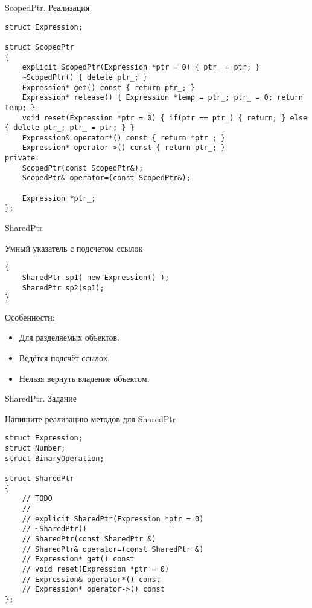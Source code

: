 \documentclass[10pt]{beamer}
\begin{document}
\begin{frame}[fragile]{ScopedPtr. Реализация}

\begin{lstlisting}
struct Expression;

struct ScopedPtr
{
    explicit ScopedPtr(Expression *ptr = 0) { ptr_ = ptr; }
    ~ScopedPtr() { delete ptr_; }
    Expression* get() const { return ptr_; }
    Expression* release() { Expression *temp = ptr_; ptr_ = 0; return temp; }
    void reset(Expression *ptr = 0) { if(ptr == ptr_) { return; } else { delete ptr_; ptr_ = ptr; } }
    Expression& operator*() const { return *ptr_; }
    Expression* operator->() const { return ptr_; }
private:
    ScopedPtr(const ScopedPtr&);
    ScopedPtr& operator=(const ScopedPtr&);

    Expression *ptr_;
};
\end{lstlisting}
\end{frame}

\begin{frame}[fragile]{SharedPtr}

Умный указатель с подсчетом ссылок 

\begin{lstlisting}
{
    SharedPtr sp1( new Expression() );
    SharedPtr sp2(sp1);
}
\end{lstlisting}

Особенности:

\begin{itemize}
    \item Для разделяемых объектов.
    \item Ведётся подсчёт ссылок.
    \item Нельзя вернуть владение объектом.
\end{itemize}

\end{frame}

\begin{frame}[fragile]{SharedPtr. Задание}

Напишите реализацию методов для SharedPtr

\begin{lstlisting}
struct Expression;
struct Number;
struct BinaryOperation;

struct SharedPtr
{
    // TODO
    //
    // explicit SharedPtr(Expression *ptr = 0)
    // ~SharedPtr()
    // SharedPtr(const SharedPtr &)
    // SharedPtr& operator=(const SharedPtr &)
    // Expression* get() const
    // void reset(Expression *ptr = 0)
    // Expression& operator*() const
    // Expression* operator->() const
};
\end{lstlisting}
\end{frame}
\end{document}
